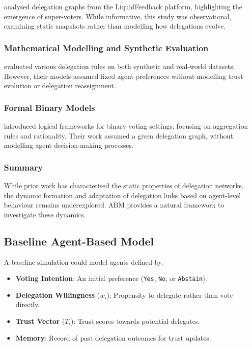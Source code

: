 \citet{kling2015votingbehaviourpoweronline} analysed delegation graphs from the LiquidFeedback platform, highlighting the emergence of super-voters. While informative, this study was observational, examining static snapshots rather than modelling how delegations evolve.

\subsubsection{Mathematical Modelling and Synthetic Evaluation}

\citet{brill_liquid_2022} evaluated various delegation rules on both synthetic and real-world datasets. However, their models assumed fixed agent preferences without modelling trust evolution or delegation reassignment.

\subsubsection{Formal Binary Models}

\citet{christoffBinaryVotingDelegable2017} introduced logical frameworks for binary voting settings, focusing on aggregation rules and rationality. Their work assumed a given delegation graph, without modelling agent decision-making processes.

\subsubsection{Summary}

While prior work has characterised the static properties of delegation networks, the dynamic formation and adaptation of delegation links based on agent-level behaviour remains underexplored. ABM provides a natural framework to investigate these dynamics.

\subsection{Baseline Agent-Based Model}

A baseline simulation could model agents defined by:

\begin{itemize}
    \item \textbf{Voting Intention}: An initial preference (\texttt{Yes}, \texttt{No}, or \texttt{Abstain}).
    \item \textbf{Delegation Willingness} ($w_i$): Propensity to delegate rather than vote directly.
    \item \textbf{Trust Vector} ($T_i$): Trust scores towards potential delegates.
    \item \textbf{Memory}: Record of past delegation outcomes for trust updates.
\end{itemize}


